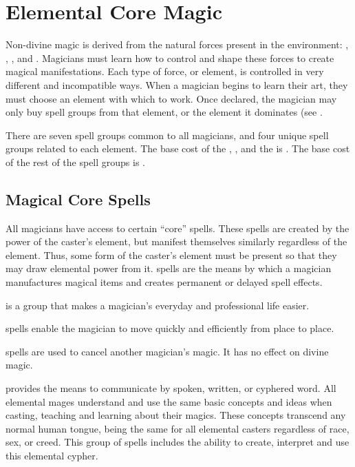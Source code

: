\chapter{Elemental Core Magic}
\label{ch:elemental-core-magic}
Non-divine magic is derived from the natural forces present in the environment: , , , and . Magicians must learn how to control and shape these forces to create magical manifestations. Each type of force, or element, is controlled in very different and incompatible ways. When a magician begins to learn their art, they must choose an element with which to work. Once declared, the magician may only buy spell groups from that element, or the element it dominates (see .

There are seven spell groups common to all magicians, and four unique spell groups related to each element. The base cost of the , ,  and the  is . The base cost of the rest of the spell groups is .

\section{Magical Core Spells}
All magicians have access to certain “core” spells. These spells are created by the power of the caster’s element, but manifest themselves similarly regardless of the element. Thus, some form of the caster’s element must be present so that they may draw elemental power from it.
 spells are the means by which a magician manufactures magical items and creates permanent or delayed spell effects.

 is a group that makes a magician’s everyday and professional life easier.

 spells enable the magician to move quickly and efficiently from place to place.

 spells are used to cancel another magician's magic. It has no effect on divine magic.

 provides the means to communicate by spoken, written, or cyphered word. All elemental mages understand and use the same basic concepts and ideas when casting, teaching and learning about their magics. These concepts transcend any normal human tongue, being the same for all elemental casters regardless of race, sex, or creed. This group of spells includes the ability to create, interpret and use
this elemental cypher.

